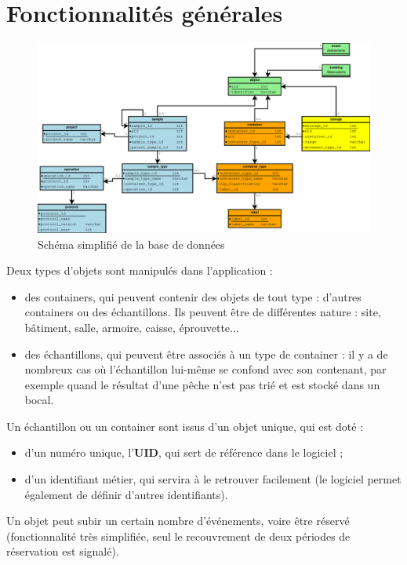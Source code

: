 \section{Fonctionnalités générales}

\begin{figure}[H]
\includegraphics[width=\linewidth]{images/db_schema_simplifie}
\caption{Schéma simplifié de la base de données}
\end{figure}

Deux types d'objets sont manipulés dans l'application :
\begin{itemize}
\item des containers, qui peuvent contenir des objets de tout type : d'autres containers ou des échantillons. Ils peuvent être de différentes nature : site, bâtiment, salle, armoire, caisse, éprouvette...
\item des échantillons, qui peuvent être associés à un type de container : il y a de nombreux cas où l'échantillon lui-même se confond avec son contenant, par exemple quand le résultat d'une pêche n'est pas trié et est stocké dans un bocal.
\end{itemize}

Un échantillon ou un container sont issus d'un objet unique, qui est doté :
\begin{itemize}
\item d'un numéro unique, l'\textbf{UID}, qui sert de référence dans le logiciel ;
\item d'un identifiant métier, qui servira à le retrouver facilement (le logiciel permet également de définir d'autres identifiants).
\end{itemize}

Un objet peut subir un certain nombre d'événements, voire être réservé (fonctionnalité très simplifiée, seul le recouvrement de deux périodes de réservation est signalé).

